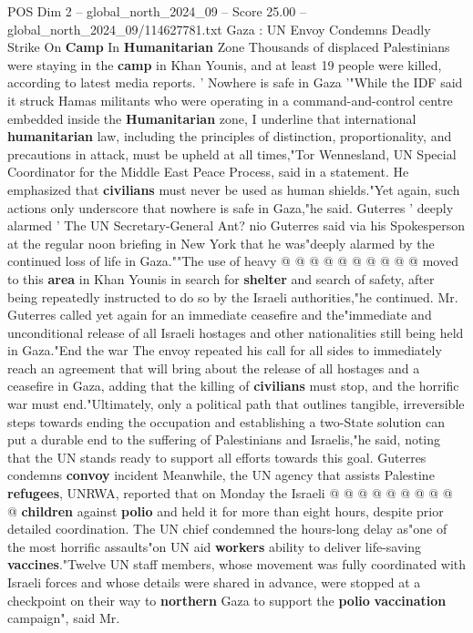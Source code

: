 \begin{textsample}{POS Dim 2 – global\_north\_2024\_09 – Score 25.00 – global\_north\_2024\_09/114627781.txt}  \label{ex:f2_pos_412}
Gaza : UN Envoy Condemns Deadly Strike On \textbf{Camp} In \textbf{Humanitarian} Zone Thousands of displaced Palestinians were staying in the \textbf{camp} in Khan Younis, and at least 19 people were killed, according to latest media reports. ' Nowhere is safe in Gaza '"While the IDF said it struck Hamas militants who were operating in a command-and-control centre embedded inside the \textbf{Humanitarian} zone, I underline that international \textbf{humanitarian} law, including the principles of distinction, proportionality, and precautions in attack, must be upheld at all times,"Tor Wennesland, UN Special Coordinator for the Middle East Peace Process, said in a statement.
He emphasized that \textbf{civilians} must never be used as human shields."Yet again, such actions only underscore that nowhere is safe in Gaza,"he said.
Guterres ' deeply alarmed ' The UN Secretary-General Ant? nio Guterres said via his Spokesperson at the regular noon briefing in New York that he was"deeply alarmed by the continued loss of life in Gaza.""The use of heavy @ @ @ @ @ @ @ @ @ @ moved to this \textbf{area} in Khan Younis in search for \textbf{shelter} and search of safety, after being repeatedly instructed to do so by the Israeli authorities,"he continued.
Mr.
Guterres called yet again for an immediate ceasefire and the"immediate and unconditional release of all Israeli hostages and other nationalities still being held in Gaza."End the war The envoy repeated his call for all sides to immediately reach an agreement that will bring about the release of all hostages and a ceasefire in Gaza, adding that the killing of \textbf{civilians} must stop, and the horrific war must end."Ultimately, only a political path that outlines tangible, irreversible steps towards ending the occupation and establishing a two-State solution can put a durable end to the suffering of Palestinians and Israelis,"he said, noting that the UN stands ready to support all efforts towards this goal.
Guterres condemns \textbf{convoy} incident Meanwhile, the UN agency that assists Palestine \textbf{refugees}, UNRWA, reported that on Monday the Israeli @ @ @ @ @ @ @ @ @ @ \textbf{children} against \textbf{polio} and held it for more than eight hours, despite prior detailed coordination.
The UN chief condemned the hours-long delay as"one of the most horrific assaults"on UN aid \textbf{workers} ability to deliver life-saving \textbf{vaccines}."Twelve UN staff members, whose movement was fully coordinated with Israeli forces and whose details were shared in advance, were stopped at a checkpoint on their way to \textbf{northern} Gaza to support the \textbf{polio} \textbf{vaccination} campaign", said Mr.

\end{textsample}
